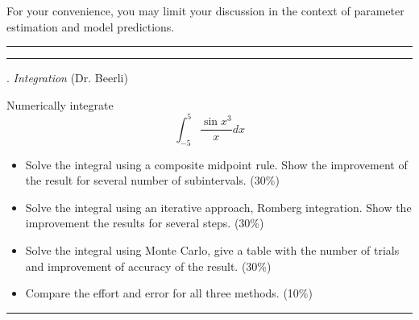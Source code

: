 \documentclass [11point]{article}
\begin{document}
For your convenience, you may limit your discussion in the context of parameter estimation and model predictions.

\bigskip
\hrule 

\pagebreak
\hrule 
{}. \textit{Integration} (Dr. Beerli)

\bigskip

Numerically integrate
$$
\int_{-5}^{5}\frac{\sin x^3}{x} dx
$$
\begin{itemize}
\item Solve the integral using a composite midpoint rule. Show the improvement of the result for several number of subintervals. (30\%)
\item Solve the integral using an iterative approach, Romberg integration. Show the improvement the results for several steps. (30\%)
\item Solve the integral using Monte Carlo, give a table with the number of trials and improvement of accuracy of the result. (30\%) 
\item Compare the effort and error for all three methods. (10\%)
\end{itemize}

\bigskip
\hrule 
\end{document}
